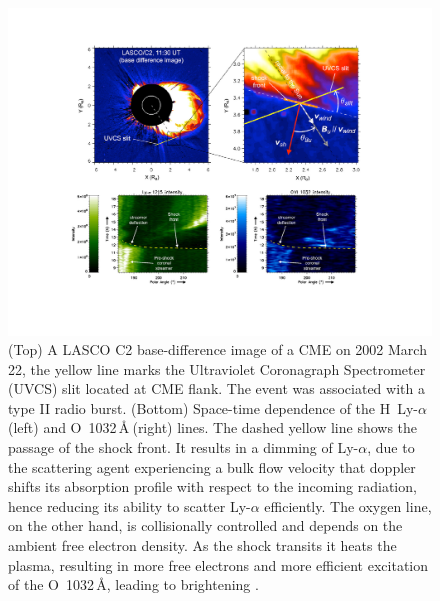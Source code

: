 
\begin{figure}[t!]
\begin{center}
\includegraphics[trim=4.5cm 3cm 0cm 3cm, scale=0.75]{images/mancuso_uvcs.pdf}
\caption[CME flank shock observed by the UVCS spectrometer]{(Top) A LASCO C2 base-difference image of a CME on 2002 March 22, the yellow line marks the Ultraviolet Coronagraph Spectrometer (UVCS) slit located at CME flank. The event was associated with a type II radio burst. (Bottom) Space-time dependence of the H\, Ly-$\alpha$ (left) and O\, 1032\,\AA$~$(right) lines. The dashed yellow line shows the passage of the shock front. It results in a dimming of Ly-$\alpha$, 
due to the scattering agent experiencing a bulk flow velocity that doppler shifts its absorption profile with respect to the incoming radiation, hence reducing its ability to scatter Ly-$\alpha$ efficiently.
The oxygen line, on the other hand, is collisionally controlled and depends on the ambient free electron density. As the shock transits it heats the plasma, resulting in more free electrons and more efficient excitation of the O\, 1032\,\AA, leading to brightening \citep{bemporad2010}.}
\label{fig:mancuso_uv}
\end{center}
\end{figure}


